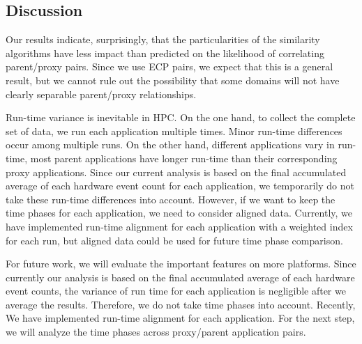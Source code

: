 \subsection{Discussion}
Our results indicate, surprisingly, that the particularities of the similarity algorithms have less impact than predicted on the likelihood of correlating parent/proxy pairs.  Since we use ECP pairs, we expect that this is a general result, but we cannot rule out the possibility that some domains will not have clearly separable parent/proxy relationships.

Run-time variance is inevitable in HPC. On the one hand, to collect the complete set of data, we run each application multiple times. Minor run-time differences occur among multiple runs. On the other hand, different applications vary in run-time, \eg most parent applications have longer run-time than their corresponding proxy applications. Since our current analysis is based on the final accumulated average of each hardware event count for each application, we temporarily do not take these run-time differences into account. However, if we want to keep the time phases for each application, we need to consider aligned data. Currently, we have implemented run-time alignment for each application with a weighted index for each run, but aligned data could be used for future time phase comparison. 

For future work, we will evaluate the important features on more platforms. Since currently our analysis is based on the final accumulated average of each hardware event counts, the variance of run time for each application is negligible after we average the results. Therefore, we do not take time phases into account. Recently, We have implemented run-time alignment for each application. For the next step, we will analyze the time phases across proxy/parent application pairs.

  